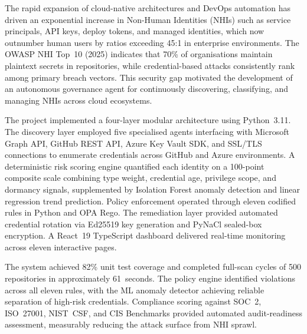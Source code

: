 
The rapid expansion of cloud-native architectures and DevOps automation has driven an exponential increase in Non-Human Identities (NHIs) such as service principals, API keys, deploy tokens, and managed identities, which now outnumber human users by ratios exceeding 45:1 in enterprise environments. The OWASP NHI Top~10 (2025) indicates that 70\% of organisations maintain plaintext secrets in repositories, while credential-based attacks consistently rank among primary breach vectors. This security gap motivated the development of an autonomous governance agent for continuously discovering, classifying, and managing NHIs across cloud ecosystems.

The project implemented a four-layer modular architecture using Python~3.11. The discovery layer employed five specialised agents interfacing with Microsoft Graph API, GitHub REST API, Azure Key Vault SDK, and SSL/TLS connections to enumerate credentials across GitHub and Azure environments. A deterministic risk scoring engine quantified each identity on a 100-point composite scale combining type weight, credential age, privilege scope, and dormancy signals, supplemented by Isolation Forest anomaly detection and linear regression trend prediction. Policy enforcement operated through eleven codified rules in Python and OPA Rego. The remediation layer provided automated credential rotation via Ed25519 key generation and PyNaCl sealed-box encryption. A React~19 TypeScript dashboard delivered real-time monitoring across eleven interactive pages.

The system achieved 82\% unit test coverage and completed full-scan cycles of 500 repositories in approximately 61~seconds. The policy engine identified violations across all eleven rules, with the ML anomaly detector achieving reliable separation of high-risk credentials. Compliance scoring against SOC~2, ISO~27001, NIST~CSF, and CIS Benchmarks provided automated audit-readiness assessment, measurably reducing the attack surface from NHI sprawl.

\vfill
\newpage
